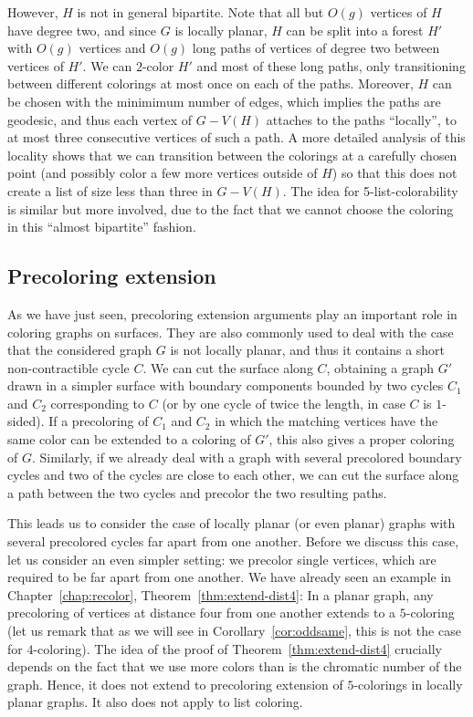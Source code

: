 \documentclass[12pt,twoside,openright,a4paper]{book}
\begin{document}
However, $H$ is not in general bipartite.  Note that all but $O(g)$ vertices of $H$ have degree two, and since $G$ is locally planar, $H$ can be split into a forest $H'$
with $O(g)$ vertices and $O(g)$ long paths of vertices of degree two between vertices of $H'$.  We can $2$-color $H'$ and most of these long
paths, only transitioning between different colorings at most once on each of the paths.  Moreover, $H$ can be chosen with the minimimum number
of edges, which implies the paths are geodesic, and thus each vertex of $G-V(H)$ attaches to the paths ``locally'',
to at most three consecutive vertices of such a path.  A more detailed analysis of this locality shows that we can transition between the
colorings at a carefully chosen point (and possibly color a few more vertices outside of $H$) so that this does not create a list of size
less than three in $G-V(H)$.  The idea for 5-list-colorability is similar but more involved, due to the fact that we cannot choose the coloring
in this ``almost bipartite'' fashion.

\subsection{Precoloring extension}

As we have just seen, precoloring extension arguments play an important role in coloring graphs on surfaces.
They are also commonly used to deal with the case that the considered graph $G$ is not locally planar, and thus it contains a short
non-contractible cycle $C$.  We can cut the surface along $C$, obtaining a graph $G'$ drawn in a simpler surface with
boundary components bounded by two cycles $C_1$ and $C_2$ corresponding to $C$ (or by one cycle of twice the length,
in case $C$ is $1$-sided).  If a precoloring of $C_1$ and $C_2$ in which the matching vertices have the same color
can be extended to a coloring of $G'$, this also gives a proper coloring of $G$.
Similarly, if we already deal with a graph with several precolored boundary cycles and two of the cycles
are close to each other, we can cut the surface along a path between the two cycles and precolor the two resulting paths.

This leads us to consider the case of locally planar (or even planar) graphs with several precolored cycles far apart from
one another.  Before we discuss this case, let us consider an even simpler setting: we precolor single vertices,
which are required to be far apart from one another.  We have already seen an example in Chapter~\ref{chap:recolor},
Theorem~\ref{thm:extend-dist4}: In a planar graph, any precoloring of vertices at distance four from one another extends to a $5$-coloring
(let us remark that as we will see in Corollary~\ref{cor:oddsame}, this is not the case for $4$-coloring).
The idea of the proof of Theorem~\ref{thm:extend-dist4} crucially depends on the fact that we use more colors than is the chromatic number
of the graph.  Hence, it does not extend to precoloring extension of $5$-colorings in locally planar graphs.
It also does not apply to list coloring.
\end{document}
